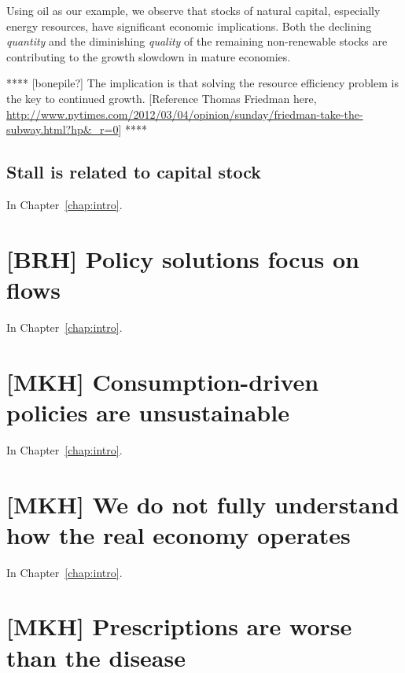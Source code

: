 Using oil as our example, we observe that 
stocks of natural capital, especially energy resources,
have significant economic implications.
Both the declining \emph{quantity} and 
the diminishing \emph{quality} of the remaining non-renewable stocks 
are contributing to the growth slowdown in mature economies.


**** [bonepile?] The implication is that solving the resource efficiency problem
is the key to continued growth. [Reference Thomas Friedman here,
\url{http://www.nytimes.com/2012/03/04/opinion/sunday/friedman-take-the-subway.html?hp&_r=0}]
****


\subsection{Stall is related to capital stock}
\label{sec:stall_capital_stock}

In Chapter~\ref{chap:intro}.


\section{[BRH] Policy solutions focus on flows}
\label{sec:policy_flows}

In Chapter~\ref{chap:intro}.


\section{[MKH] Consumption-driven policies are unsustainable}
\label{sec:consumption_unsustainable}

In Chapter~\ref{chap:intro}.


\section{[MKH] We do not fully understand how the real economy operates}
\label{sec:dont_understand_real_economy}

In Chapter~\ref{chap:intro}.


\section{[MKH] Prescriptions are worse than the disease}
\label{sec:prescriptions_disease}

